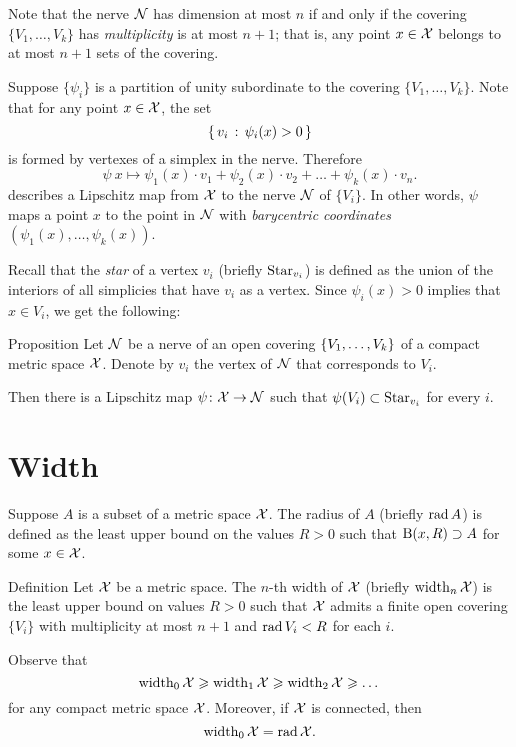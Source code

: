 Note that the nerve $\mathcal{N}$ has dimension at most $n$ if and only if the covering $\{V_1,\dots,V_k\}$ has \emph{multiplicity} is at most $n+1$;
that is, any point $x\in\mathcal{X}$ belongs to
at most $n+1$ sets of the covering.

Suppose $\{\psi_i\}$ is  
a partition of unity subordinate to the covering $\{V_1,\dots,V_k\}$.
Note that for any point $x\in {\mathcal{X}}$, the set
$$\left\{\,{v_i}\,:\,{\psi_i(x)>0}\,\right\}$$
is formed by vertexes of a simplex in the nerve.
Therefore 
$$\psi\:x\mapsto \psi_1(x)\cdot v_1+\psi_2(x)\cdot v_2+\dots+\psi_k(x)\cdot v_n.$$
describes a Lipschitz map from ${\mathcal{X}}$ to the nerve $\mathcal{N}$ of $\{V_i\}$.
In other words, $\psi$ maps a point $x$ to the point in $\mathcal{N}$ with \emph{barycentric coordinates} $(\psi_1(x),\dots,\psi_k(x))$.

Recall that the \emph{star} of a vertex $v_i$ (briefly $\mathop{\rm Star}\nolimits_{v_i}$)\index{$\Star$} is defined as the union of the interiors of all simplicies that have $v_i$ as a vertex.
Since $\psi_i(x)>0$ implies that $x\in V_i$, we get the following:

\begin{thm}{Proposition}\label{prop:space->nerve}
Let $\mathcal{N}$ be a nerve of an open covering $\{V_1,\z\dots,V_k\}$ of a compact metric space $\mathcal{X}$.
Denote by $v_i$ the vertex of $\mathcal{N}$ that corresponds to $V_i$.

Then there is a Lipschitz map $\psi\colon\mathcal{X}\to\mathcal{N}$ such that $\psi(V_i)\z\subset\Star_{v_i}$ for every $i$.
\end{thm}


\section{Width}

Suppose $A$ is a subset of a metric space $\mathcal{X}$.
The radius of $A$ (briefly $\mathop{\rm rad}\nolimits A$) is defined as the least upper bound on the values $R>0$ such that $\mathrm{B}{}(x,R)\supset A$ for some $x\in \mathcal{X}$.

\begin{thm}{Definition}\label{def:width}
Let $\mathcal{X}$ be a metric space.
The $n$-th width of $\mathcal{X}$ (briefly $\operatorname{\rm width}\nolimits_n\mathcal{X}$) is the least upper bound on values $R>0$ such that $\mathcal{X}$ admits a finite open covering $\{V_i\}$ with multiplicity at most $n+1$ and $\mathop{\rm rad}\nolimits V_i< R$ for each $i$.
\end{thm}

 Observe that 
\[\operatorname{\rm width}\nolimits_0\mathcal{X}\geqslant\operatorname{\rm width}\nolimits_1\mathcal{X}\geqslant\operatorname{\rm width}\nolimits_2\mathcal{X}\geqslant\dots\]
for any compact metric space $\mathcal{X}$.
Moreover, if $\mathcal{X}$ is connected, then 
\[\operatorname{\rm width}\nolimits_0\mathcal{X}=\mathop{\rm rad}\nolimits\mathcal{X}.\]

